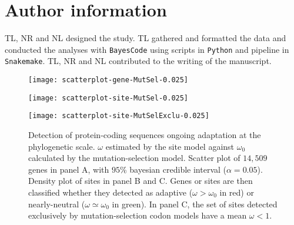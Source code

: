 \documentclass{article}
\begin{document}
    \section{Author information}\label{sec:author-information}
    TL, NR and NL designed the study.
    TL gathered and formatted the data and conducted the analyses with \texttt{BayesCode} using scripts in \texttt{Python} and pipeline in \texttt{Snakemake}.
    TL, NR and NL contributed to the writing of the manuscript.

    \printbibliography

    \begin{figure*}[!ht]
        \centering
        \begin{minipage}{0.32\linewidth}
            \texttt{[image: scatterplot-gene-MutSel-0.025]}
        \end{minipage}
        \hfill
        \begin{minipage}{0.32\linewidth}
            \texttt{[image: scatterplot-site-MutSel-0.025]}
        \end{minipage}
        \hfill
        \begin{minipage}{0.32\linewidth}
            \texttt{[image: scatterplot-site-MutSelExclu-0.025]}
        \end{minipage}
        \hfill
        \caption{
            Detection of protein-coding sequences ongoing adaptation at the phylogenetic scale.
            $\omega$ estimated by the site model against $\omega_{0}$ calculated by the mutation-selection model.
            Scatter plot of $14,509$ genes in panel A, with $95$\% bayesian credible interval ($\alpha=0.05$).
            Density plot of sites in panel B and C.
            Genes or sites are then classified whether they detected as adaptive ($\omega > \omega_{0}$ in red) or nearly-neutral ($\omega \simeq \omega_{0}$ in green).
            In panel C, the set of sites detected exclusively by mutation-selection codon models have a mean $\omega < 1 $.}
        \label{fig:scatterplot}
    \end{figure*}
\end{document}
